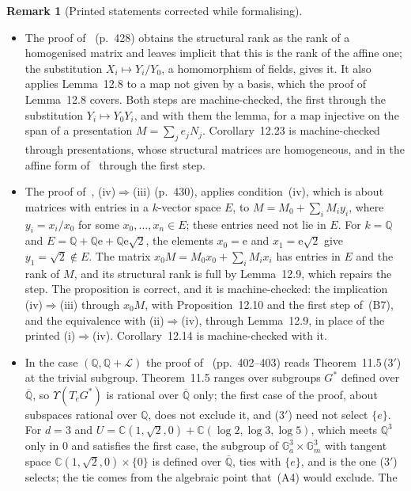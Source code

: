 \documentclass[11pt,a4paper]{article}
\theoremstyle{plain}
\theoremstyle{definition}
\newtheorem{remark}[theorem]{Remark}
\newcommand{\C}{\mathbb{C}}
\newcommand{\e}{\mathrm{e}}
\newcommand{\Q}{\mathbb{Q}}
\newcommand{\Alg}{\overline{\mathbb{Q}}}
\newcommand{\Logs}{\mathcal{L}}
\begin{document}
\begin{remark}[Printed statements corrected while formalising]
\begin{itemize}
decomposition, and the Lemma is correct. The formal proof goes through the superadditivity of the closed form
instead.
\item[(B7)] The proof of~\cite[Lemma~12.9]{waldschmidt-book} (p.~428) obtains the structural rank as the rank of a
homogenised matrix and leaves implicit that this is the rank of the affine one; the substitution
$X_{i}\mapsto Y_{i}/Y_{0}$, a homomorphism of fields, gives it. It also applies Lemma~12.8 to a map not given by a
basis, which the proof of Lemma~12.8 covers. Both steps are machine-checked, the first through the substitution
$Y_{i}\mapsto Y_{0}Y_{i}$, and with them the lemma, for a map injective on the span of a presentation
$M=\sum_{j}e_{j}N_{j}$. Corollary~12.23 is machine-checked through presentations, whose structural matrices are
homogeneous, and in the affine form of~\cite[p.~435]{waldschmidt-book} through the first step.
\item[(B8)] The proof of~\cite[Proposition~12.13]{waldschmidt-book}, (iv)$\Rightarrow$(iii) (p.~430), applies
condition~(iv), which is about matrices with entries in a $k$-vector space $E$, to $M=M_{0}+\sum_{i}M_{i}y_{i}$, where
$y_{i}=x_{i}/x_{0}$ for some $x_{0},\dots,x_{n}\in E$; these entries need not lie in $E$. For $k=\Q$ and
$E=\Q+\Q\e+\Q\e\sqrt{2}$, the elements $x_{0}=\e$ and $x_{1}=\e\sqrt{2}$ give $y_{1}=\sqrt{2}\notin E$. The matrix
$x_{0}M=M_{0}x_{0}+\sum_{i}M_{i}x_{i}$ has entries in $E$ and the rank of $M$, and its structural rank is full by
Lemma~12.9, which repairs the step. The proposition is correct, and it is machine-checked: the implication
(iv)$\Rightarrow$(iii) through $x_{0}M$, with Proposition~12.10 and the first step of~(B7), and the equivalence with
(ii)$\Rightarrow$(iv), through Lemma~12.9, in place of the printed (i)$\Rightarrow$(iv). Corollary~12.14 is
machine-checked with it.
\item[(B9)] In the case $(\Q,\Q+\Logs)$ the proof of~\cite[Proposition~11.19]{waldschmidt-book} (pp.~402--403) reads
Theorem~11.5\,(3$'$) at the trivial subgroup. Theorem~11.5 ranges over subgroups $G^{*}$ defined over $\Alg$, so
$\Upsilon(T_{e}G^{*})$ is rational over $\Alg$ only; the first case of the proof, about subspaces rational over $\Q$,
does not exclude it, and (3$'$) need not select $\{e\}$. For $d=3$ and $U=\C(1,\sqrt{2},0)+\C(\log2,\log3,\log5)$,
which meets $\Q^{3}$ only in $0$ and satisfies the first case, the subgroup of
$\mathbb{G}_{a}^{3}\times\mathbb{G}_{m}^{3}$ with tangent space $\C(1,\sqrt{2},0)\times\{0\}$ is defined over $\Alg$,
ties with $\{e\}$, and is the one (3$'$) selects; the tie comes from the algebraic point that~(A4) would exclude. The

\end{itemize}
\end{remark}
\end{document}
